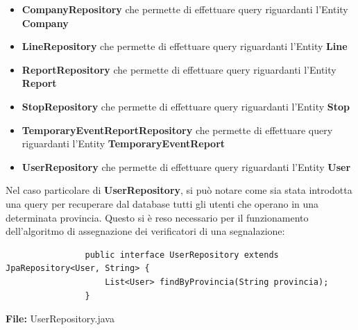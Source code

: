         \begin{itemize}
            \item \textbf{CompanyRepository} che permette di effettuare query riguardanti l'Entity \textbf{Company}
            \item \textbf{LineRepository} che permette di effettuare query riguardanti l'Entity \textbf{Line}
            \item \textbf{ReportRepository} che permette di effettuare query riguardanti l'Entity \textbf{Report}
            \item \textbf{StopRepository} che permette di effettuare query riguardanti l'Entity \textbf{Stop}
            \item \textbf{TemporaryEventReportRepository} che permette di effettuare query riguardanti l'Entity \textbf{TemporaryEventReport}
            \item \textbf{UserRepository} che permette di effettuare query riguardanti l'Entity \textbf{User}
        \end{itemize}

        Nel caso particolare di \textbf{UserRepository}, si può notare come sia stata introdotta una query per recuperare dal database tutti gli utenti che operano in una determinata provincia. Questo si è reso necessario per il funzionamento dell'algoritmo di assegnazione dei verificatori di una segnalazione:

        \begin{code}
            \begin{verbatim}
                public interface UserRepository extends JpaRepository<User, String> {
                    List<User> findByProvincia(String provincia);
                }
            \end{verbatim}
            \caption{\textbf{File:} UserRepository.java}
        \end{code}
        

